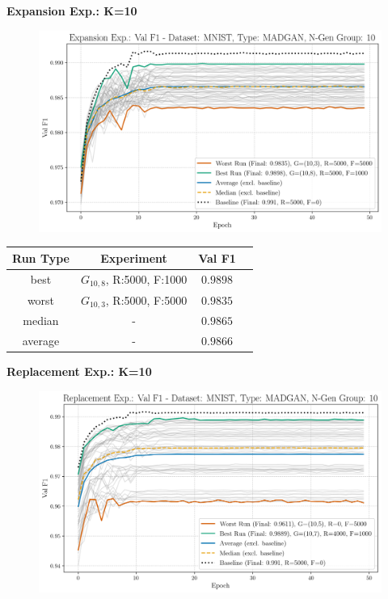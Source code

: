 \newpage
\noindent\textbf{Expansion Exp.: K=10}
\begin{figure}[htbp]
	\centering
	\includegraphics[width=.85\textwidth]{abb/strat_classifier_performance/MNIST_STRATIFIED_CLASSIFIERS_MADGAN_NEW/expansion_experiments/val_f1_score_MADGAN_MNIST_n_gen_10_all.png}
	\label{fig:app_strat_class_performance_expansion_exp._val_f1_score_10}
\end{figure}
\begin{table}[H]
	\vspace{-1em}
	\centering
	\begin{tabular}{|c|c|c|c|}
		\hline
		Run Type & Experiment & Val F1 \\ \hline
		best & \(G_{10, 8}\), R:5000, F:1000 & $0.9898$\\ \hline
		worst & \(G_{10, 3}\), R:5000, F:5000 & $0.9835$\\ \hline
		median & - & $0.9865$\\ \hline
		average & - & $0.9866$
		\\ \hline
	\end{tabular}
\end{table}
\noindent\textbf{Replacement Exp.: K=10}
\begin{figure}[htbp]
	\centering
	\includegraphics[width=.85\textwidth]{abb/strat_classifier_performance/MNIST_STRATIFIED_CLASSIFIERS_MADGAN_NEW/replacement_experiments/val_f1_score_MADGAN_MNIST_n_gen_10_all.png}
	\label{fig:app_strat_class_performance_replacement_exp._val_f1_score_10}
\end{figure}
